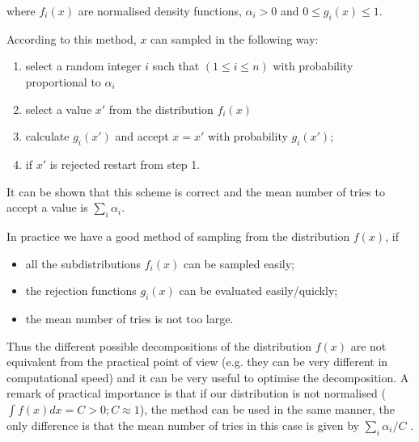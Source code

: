 where $f _i (x)$ are normalised density functions, $\alpha _i > 0 $ and
$ 0 \leq g_i (x) \leq 1 $.

According to this method, $x$ can sampled in the following way:
\begin{enumerate}
\item
select a random integer $i$ such that $(1\leq i \leq n)$
with probability proportional to $\alpha_i $
\item
select a value $x'$ from the distribution $f_i (x)$
\item
calculate $g_i (x')$ and accept $x = x'$ with probability
$g_i (x')$;
\item if $x'$ is rejected restart from step 1.
\end{enumerate}
It can be shown that this scheme is correct and the mean
number of tries to accept a value is $ \sum_{i}\alpha_i $.

In practice we have a good method of sampling from the distribution $f(x)$, if
\begin{itemize}
\item all the subdistributions $ f_i (x)$ can be sampled easily;
\item the rejection functions $ g_i(x)$ can be evaluated easily/quickly;
\item the mean number of tries is not too large.
\end{itemize}
Thus the different possible decompositions of the distribution
$f(x)$ are not equivalent from the practical point of view (e.g. they
can be very different in computational speed) and it can be very useful
to optimise the decomposition.
A remark of practical importance is that if our distribution is not
normalised ($\int f(x)dx=C>0; C\approx 1$), the method can be used in the same
manner, the only difference is that the mean number of tries in this
case is given by  $\sum_ {i}\alpha_i/C$ .

